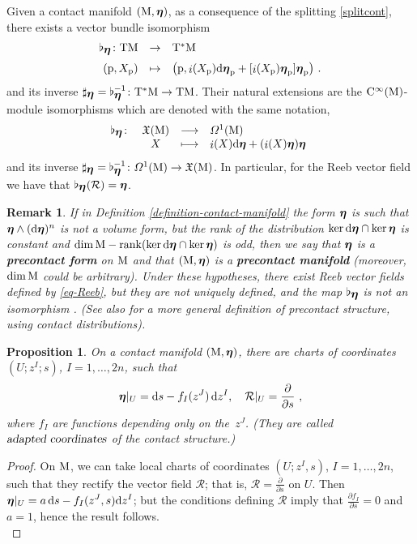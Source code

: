 \documentclass[12pt]{report}
\newtheorem{prop}[teor]{Proposition}
\newtheorem{remark}[teor]{Remark}
\def\beq{\begin{equation}}
\def\eeq{\end{equation}}
\def\derpar#1#2{\frac{\partial{#1}}{\partial{#2}}}
\def\qed{\ifvmode\removelastskip\fi
{\unskip\nobreak\hfil\penalty50\hbox{}\nobreak\hfil
\hbox{\vrule height1.2ex width1.2ex}\parfillskip=0pt
\finalhyphendemerits=0 \par\smallskip}}
\def\vf{\mathfrak X}
\def\df{{\mit\Omega}}
\def\d{{\rm d}}
\def\bmeta{\mbox{\boldmath $\eta$}}
\def\Tan{{\rm T}}
\def\inn{\mathop{i}\nolimits}
\def\Cinfty{{\rm C}^\infty}
\newcommand{\Reeb}{\mathcal{R}}
\begin{document}
Given a contact manifold $({\rm M},\bmeta)$, as a consequence of the splitting \eqref{splitcont}, there exists a vector bundle isomorphism
$$
    \begin{array}{rcl}
        \flat_{\bmeta}\colon \Tan {\rm M} & \to & \Tan^*{\rm M}\\ \noalign{\medskip}
       ({\rm p},X_{\rm p}) & \mapsto & 
\big({\rm p},\inn(X_{\rm p})\d\bmeta_{\rm p} + [\inn(X_{\rm p})\bmeta_{\rm p}]\bmeta_{\rm p}\big)\ .
    \end{array}
$$
and its inverse $\sharp_{\bmeta}=\flat_{\bmeta}^{-1}\colon \Tan^*{\rm M} \to \Tan {\rm M}$.
Their natural extensions are the $\Cinfty({\rm M})$-module isomorphisms
which are denoted with the same notation,
\beq
\begin{array}{rccl}
   \flat_{\bmeta}\colon & \vf({\rm M}) & \longrightarrow & \df^1({\rm M}) \\
   & X & \longmapsto & \inn(X)\d\bmeta+(\inn(X)\bmeta)\bmeta
\end{array} \ 
\label{isocont}
\eeq
and its inverse $\sharp_{\bmeta}=\flat_{\bmeta}^{-1}\colon \df^1({\rm M})\to \vf({\rm M})$.
In particular, for the Reeb vector field
we have that $\flat_{\bmeta}(\Reeb)=\bmeta$.

\begin{remark}
\label{nocontacto}{\rm
If in Definition \ref{definition-contact-manifold} the form $\bmeta$ is such that
$\bmeta\wedge(\d\bmeta)^{n}$ is not a volume form, 
but the rank of the distribution $\ker\d\bmeta\cap\ker\bmeta$ is constant 
and $\dim{\rm M}-{\rm rank}(\ker\d\bmeta\cap\ker\bmeta)$ is odd,
then we say that $\bmeta$ is a {\sl \textbf{precontact form}} on ${\rm M}$
and that $({\rm M},\bmeta)$ is a {\sl \textbf{precontact manifold}}
(moreover, ${\rm dim}\,{\rm M}$ could be arbitrary).
Under these hypotheses, there exist Reeb vector fields defined by \eqref{eq-Reeb}, but they are not uniquely defined,
and the map $\flat_{\bmeta}$ is not an isomorphism \cite{LGGMR-2023}.
(See also \cite{GG-2023} for a more general definition of precontact structure,
using {\sl contact distributions\/}).
}\end{remark}

\begin{prop}\label{prop-adapted-coord}
On a contact manifold $({\rm M},\bmeta)$, there are charts of coordinates $(U;z^I;s)$, $I=1,\ldots,2n$,
such that
$$
\bmeta\vert_U = \d s - f_I(z^J) \,\d z^I 
,\quad
\Reeb\vert_U = \frac{\partial}{\partial s}\ ,
$$
where $f_I$ are functions depending only on the~$z^J$.
(They are called $\textsl{adapted coordinates}$ of the contact structure.)
\end{prop}
\begin{proof}
On ${\rm M}$, we can take local charts of coordinates $(U;z^I,s)$, $I=1,\ldots,2n$, such that they rectify the vector field $\Reeb$; that is, $\Reeb=\displaystyle\derpar{}{s}$ on $U$.
Then $\displaystyle\bmeta\vert_U=a\,\d s-f_I(z^J,s)\d z^I$; but the conditions defining $\Reeb$ imply that  $\displaystyle\derpar{f_I}{s}=0$ and $a=1$, hence the result follows.
\\ \qed \end{proof}
\end{document}
